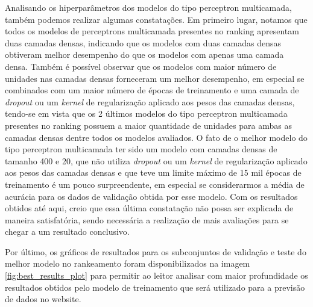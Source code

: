 Analisando os hiperparâmetros dos modelos do tipo perceptron multicamada, também podemos realizar algumas constatações. Em primeiro lugar, notamos que todos os modelos de perceptrons multicamada presentes no ranking apresentam duas camadas densas, indicando que os modelos com duas camadas densas obtiveram melhor desempenho do que os modelos com apenas uma camada densa. Também é possível observar que os modelos com maior número de unidades nas camadas densas forneceram um melhor desempenho, em especial se combinados com um maior número de épocas de treinamento e uma camada de \textit{dropout} ou um \textit{kernel} de regularização aplicado aos pesos das camadas densas, tendo-se em vista que os 2 últimos modelos do tipo perceptron multicamada presentes no ranking possuem a maior quantidade de unidades para ambas as camadas densas dentre todos os modelos avaliados. O fato de o melhor modelo do tipo perceptron multicamada ter sido um modelo com camadas densas de tamanho 400 e 20, que não utiliza \textit{dropout} ou um \textit{kernel} de regularização aplicado aos pesos das camadas densas e que teve um limite máximo de 15 mil épocas de treinamento é um pouco surpreendente, em especial se considerarmos a média de acurácia para os dados de validação obtida por esse modelo. Com os resultados obtidos até aqui, creio que essa última constatação não possa ser explicada de maneira satisfatória, sendo necessária a realização de mais avaliações para se chegar a um resultado conclusivo.

Por último, os gráficos de resultados para os subconjuntos de validação e teste do melhor modelo no rankeamento foram disponibilizados na imagem \ref{fig:best_results_plot} para permitir ao leitor analisar com maior profundidade os resultados obtidos pelo modelo de treinamento que será utilizado para a previsão de dados no website.

